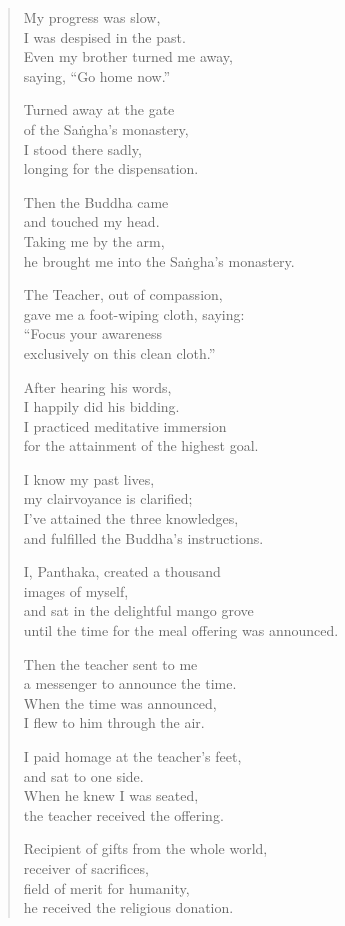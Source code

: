 \documentclass[12pt,openany]{book}%
\begin{document}
\begin{verse}%
My progress was slow, \\
I was despised in the past. \\
Even my brother turned me away, \\
saying, “Go home now.” 

Turned away at the gate \\
of the \textsanskrit{Saṅgha}’s monastery, \\
I stood there sadly, \\
longing for the dispensation. 

Then the Buddha came \\
and touched my head. \\
Taking me by the arm, \\
he brought me into the \textsanskrit{Saṅgha}’s monastery. 

The Teacher, out of compassion, \\
gave me a foot-wiping cloth, saying: \\
“Focus your awareness \\
exclusively on this clean cloth.” 

After hearing his words, \\
I happily did his bidding. \\
I practiced meditative immersion \\
for the attainment of the highest goal. 

I know my past lives, \\
my clairvoyance is clarified; \\
I’ve attained the three knowledges, \\
and fulfilled the Buddha’s instructions. 

I, Panthaka, created a thousand \\
images of myself, \\
and sat in the delightful mango grove \\
until the time for the meal offering was announced. 

Then the teacher sent to me \\
a messenger to announce the time. \\
When the time was announced, \\
I flew to him through the air. 

I paid homage at the teacher’s feet, \\
and sat to one side. \\
When he knew I was seated, \\
the teacher received the offering. 

Recipient of gifts from the whole world, \\
receiver of sacrifices, \\
field of merit for humanity, \\
he received the religious donation. 

%
\end{verse}
\end{document}
